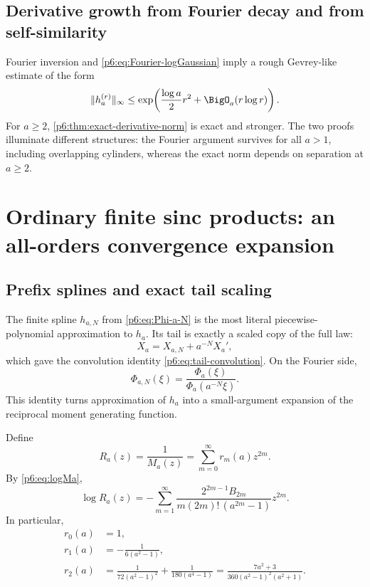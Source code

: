 \documentclass[11pt,oneside]{article}
\numberwithin{equation}{section}
\theoremstyle{definition}
\theoremstyle{remark}
\begin{document}
\subsection{Derivative growth from Fourier decay and from self-similarity}

Fourier inversion and \eqref{p6:eq:Fourier-logGaussian} imply a rough
Gevrey-like estimate of the form
\[
 \|h_a^{(r)}\|_\infty
 \le\exp\!\left(\frac{\log a}{2}r^2+\BigO_a(r\log r)\right).
\]
For $a\ge2$, \cref{p6:thm:exact-derivative-norm} is exact and stronger.  The two
proofs illuminate different structures: the Fourier argument survives for all
$a>1$, including overlapping cylinders, whereas the exact norm depends on
separation at $a\ge2$.

\section{Ordinary finite sinc products: an all-orders convergence expansion}

\subsection{Prefix splines and exact tail scaling}

The finite spline $h_{a,N}$ from \eqref{p6:eq:Phi-a-N} is the most literal
piecewise-polynomial approximation to $h_a$.  Its tail is exactly a scaled copy
of the full law:
\[
 X_a=X_{a,N}+a^{-N}X_a',
\]
which gave the convolution identity \eqref{p6:eq:tail-convolution}.  On the Fourier
side,
\begin{equation}\label{p6:eq:prefix-ratio}
 \Phi_{a,N}(\xi)
 =\frac{\Phi_a(\xi)}{\Phi_a(a^{-N}\xi)}.
\end{equation}
This identity turns approximation of $h_a$ into a small-argument expansion of
the reciprocal moment generating function.

Define
\begin{equation}\label{p6:eq:Ra}
 R_a(z)=\frac1{M_a(z)}
 =\sum_{m=0}^{\infty}r_m(a)z^{2m}.
\end{equation}
By \eqref{p6:eq:logMa},
\begin{equation}\label{p6:eq:logRa}
 \log R_a(z)=
 -\sum_{m=1}^{\infty}
 \frac{2^{2m-1}B_{2m}}
 {m(2m)!\,(a^{2m}-1)}z^{2m}.
\end{equation}
In particular,
\begin{align}
 r_0(a)&=1,\label{p6:eq:r0}\\
 r_1(a)&=-\frac1{6(a^2-1)},\label{p6:eq:r1}\\
 r_2(a)&=\frac1{72(a^2-1)^2}
 +\frac1{180(a^4-1)}
 =\frac{7a^2+3}{360(a^2-1)^2(a^2+1)}.
 \label{p6:eq:r2}
\end{align}
\end{document}
